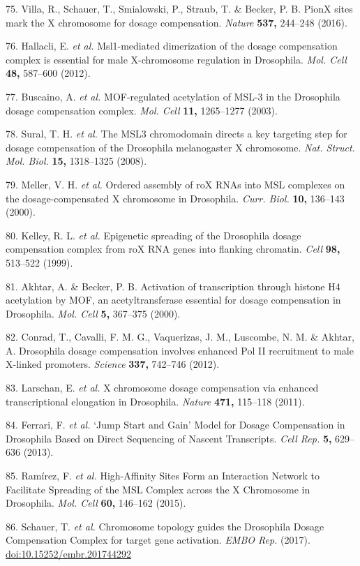 \documentclass[11pt,twoside]{MPIthesis}
\theoremstyle{definition}
\theoremstyle{definition}
\theoremstyle{definition}
\theoremstyle{remark}
\begin{document}
75. Villa, R., Schauer, T., Smialowski, P., Straub, T. \& Becker, P. B.
PionX sites mark the X chromosome for dosage compensation. \emph{Nature}
\textbf{537,} 244--248 (2016).

76. Hallacli, E. \emph{et al.} Msl1-mediated dimerization of the dosage
compensation complex is essential for male X-chromosome regulation in
Drosophila. \emph{Mol. Cell} \textbf{48,} 587--600 (2012).

77. Buscaino, A. \emph{et al.} MOF-regulated acetylation of MSL-3 in the
Drosophila dosage compensation complex. \emph{Mol. Cell} \textbf{11,}
1265--1277 (2003).

78. Sural, T. H. \emph{et al.} The MSL3 chromodomain directs a key
targeting step for dosage compensation of the Drosophila melanogaster X
chromosome. \emph{Nat. Struct. Mol. Biol.} \textbf{15,} 1318--1325
(2008).

79. Meller, V. H. \emph{et al.} Ordered assembly of roX RNAs into MSL
complexes on the dosage-compensated X chromosome in Drosophila.
\emph{Curr. Biol.} \textbf{10,} 136--143 (2000).

80. Kelley, R. L. \emph{et al.} Epigenetic spreading of the Drosophila
dosage compensation complex from roX RNA genes into flanking chromatin.
\emph{Cell} \textbf{98,} 513--522 (1999).

81. Akhtar, A. \& Becker, P. B. Activation of transcription through
histone H4 acetylation by MOF, an acetyltransferase essential for dosage
compensation in Drosophila. \emph{Mol. Cell} \textbf{5,} 367--375
(2000).

82. Conrad, T., Cavalli, F. M. G., Vaquerizas, J. M., Luscombe, N. M. \&
Akhtar, A. Drosophila dosage compensation involves enhanced Pol II
recruitment to male X-linked promoters. \emph{Science} \textbf{337,}
742--746 (2012).

83. Larschan, E. \emph{et al.} X chromosome dosage compensation via
enhanced transcriptional elongation in Drosophila. \emph{Nature}
\textbf{471,} 115--118 (2011).

84. Ferrari, F. \emph{et al.} `Jump Start and Gain' Model for Dosage
Compensation in Drosophila Based on Direct Sequencing of Nascent
Transcripts. \emph{Cell Rep.} \textbf{5,} 629--636 (2013).

85. Ramírez, F. \emph{et al.} High-Affinity Sites Form an Interaction
Network to Facilitate Spreading of the MSL Complex across the X
Chromosome in Drosophila. \emph{Mol. Cell} \textbf{60,} 146--162 (2015).

86. Schauer, T. \emph{et al.} Chromosome topology guides the Drosophila
Dosage Compensation Complex for target gene activation. \emph{EMBO Rep.}
(2017). \url{doi:10.15252/embr.201744292}
\end{document}
